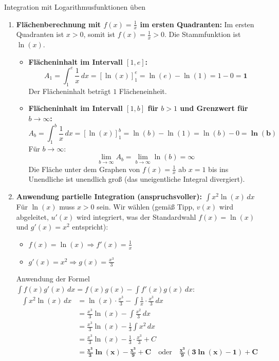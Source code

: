 \begin{loesungsumgebung}{Integration mit Logarithmusfunktionen üben}
\begin{enumerate}[label=(\alph*)]
    \item \textbf{Flächenberechnung mit $f(x) = \frac{1}{x}$ im ersten Quadranten:}
    Im ersten Quadranten ist $x>0$, somit ist $f(x)=\frac{1}{x} > 0$. Die Stammfunktion ist $\ln(x)$.
    \begin{itemize}
        \item \textbf{Flächeninhalt im Intervall $[1, e]$:}
        $$ A_1 = \int_1^e \frac{1}{x} \,dx = [\ln(x)]_1^e = \ln(e) - \ln(1) = 1 - 0 = \mathbf{1} $$
        Der Flächeninhalt beträgt $1$ Flächeneinheit.

        \item \textbf{Flächeninhalt im Intervall $[1, b]$ für $b>1$ und Grenzwert für $b \to \infty$:}
        $$ A_b = \int_1^b \frac{1}{x} \,dx = [\ln(x)]_1^b = \ln(b) - \ln(1) = \ln(b) - 0 = \mathbf{\ln(b)} $$
        Für $b \to \infty$:
        $$ \lim_{b \to \infty} A_b = \lim_{b \to \infty} \ln(b) = \mathbf{\infty} $$
        Die Fläche unter dem Graphen von $f(x)=\frac{1}{x}$ ab $x=1$ bis ins Unendliche ist unendlich groß (das uneigentliche Integral divergiert).
    \end{itemize}

    \item \textbf{Anwendung partielle Integration (anspruchsvoller): $\int x^2 \ln(x) \,dx$} \\
    Für $\ln(x)$ muss $x>0$ sein. Wir wählen (gemäß Tipp, $v(x)$ wird abgeleitet, $u'(x)$ wird integriert, was der Standardwahl $f(x)=\ln(x)$ und $g'(x)=x^2$ entspricht):
    \begin{itemize}
        \item $f(x) = \ln(x) \Rightarrow f'(x) = \frac{1}{x}$
        \item $g'(x) = x^2 \Rightarrow g(x) = \frac{x^3}{3}$
    \end{itemize}
    Anwendung der Formel $\int f(x)g'(x) \,dx = f(x)g(x) - \int f'(x)g(x) \,dx$:
    \begin{align*} \int x^2 \ln(x) \,dx &= \ln(x) \cdot \frac{x^3}{3} - \int \frac{1}{x} \cdot \frac{x^3}{3} \,dx \\ &= \frac{x^3}{3}\ln(x) - \int \frac{x^2}{3} \,dx \\ &= \frac{x^3}{3}\ln(x) - \frac{1}{3} \int x^2 \,dx \\ &= \frac{x^3}{3}\ln(x) - \frac{1}{3} \cdot \frac{x^3}{3} + C \\ &= \mathbf{\frac{x^3}{3}\ln(x) - \frac{x^3}{9} + C} \quad \text{oder} \quad \mathbf{\frac{x^3}{9}(3\ln(x) - 1) + C} \end{align*}
\end{enumerate}

\end{loesungsumgebung}








